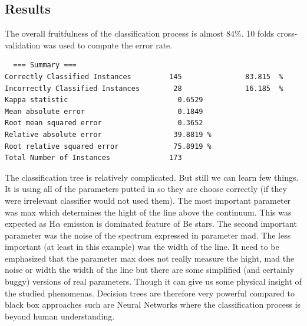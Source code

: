 \subsection{Results}


The overall fruitfulness of the classification process is almost
84\%. 10 folds cross-validation was used to compute the error
rate. 


\begin{lstlisting}
  === Summary ===
Correctly Classified Instances         145               83.815  %
Incorrectly Classified Instances        28               16.185  %
Kappa statistic                          0.6529
Mean absolute error                      0.1849
Root mean squared error                  0.3652
Relative absolute error                 39.8819 %
Root relative squared error             75.8919 %
Total Number of Instances              173     
\end{lstlisting}

The classification tree is relatively complicated. But still we can
learn few things. It is using all of the parameters putted in so they
are choose correctly (if they were irrelevant classifier would not
used them). The most important parameter was \textrm{max} which
determines the hight of the line above the continuum. This was
expected as H$\alpha$ emission is dominated feature of Be stars. The
second important parameter was the noise of the spectrum expressed in
parameter \textrm{mad}. The less important (at least in this example)
was the width of the line. It need to be emphasized that the parameter
\textrm{max} does not really measure the hight, \textrm{mad} the noise
or \textrm{width} the width of the line but there are some simplified
(and certainly buggy) versions of real parameters. Though it can give
us some physical insight of the studied phenomenas. Decision trees are
therefore very powerful compared to black box approaches such are
Neural Networks where the classification process is beyond human
understanding.

